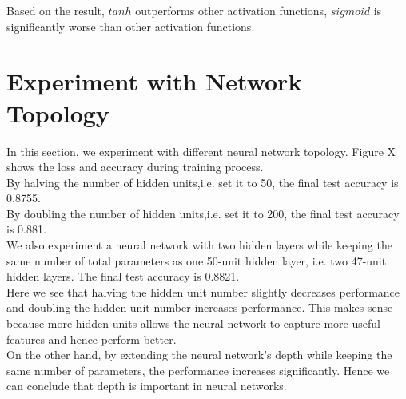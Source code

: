 \documentclass{article} %
\begin{document}
Based on the result, $tanh$ outperforms other activation functions, $sigmoid$ is significantly worse than other activation functions. \\

\section{Experiment with Network Topology}
In this section, we experiment with different neural network topology. Figure X shows the loss and accuracy during training process. \\
By halving the number of hidden units,i.e. set it to 50, the final test accuracy is 0.8755.\\
By doubling the number of hidden units,i.e. set it to 200, the final test accuracy is 0.881.\\
We also experiment a neural network with two hidden layers while keeping the same number of total parameters as one 50-unit hidden layer, i.e. two 47-unit hidden layers. The final test accuracy is 0.8821. \\

Here we see that halving the hidden unit number slightly decreases performance and doubling the hidden unit number increases performance. This makes sense because more hidden units allows the neural network to capture more useful features and hence perform better. \\
On the other hand, by extending the neural network's depth while keeping the same number of parameters, the performance increases significantly. Hence we can conclude that depth is important in neural networks.
\end{document}
